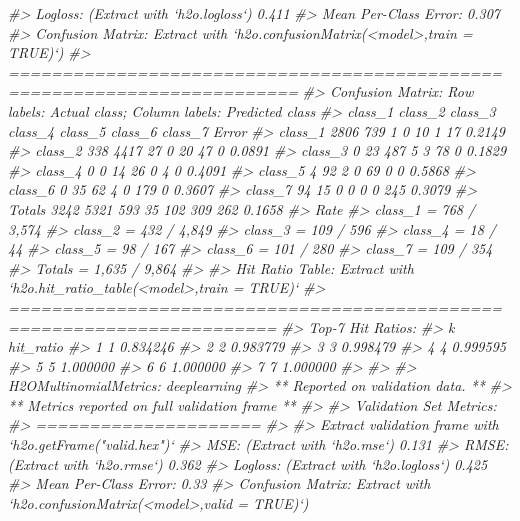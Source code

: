 \documentclass[]{book}
\newenvironment{Shaded}{\begin{snugshade}}{\end{snugshade}}
\newcommand{\CommentTok}[1]{\textcolor[rgb]{0.56,0.35,0.01}{\textit{#1}}}
\begin{document}
\begin{Shaded}
\begin{Highlighting}[]
{{{{{{{{{{{{{{\CommentTok{#> Logloss: (Extract with `h2o.logloss`) 0.411}
\CommentTok{#> Mean Per-Class Error: 0.307}
\CommentTok{#> Confusion Matrix: Extract with `h2o.confusionMatrix(<model>,train = TRUE)`)}
\CommentTok{#> =========================================================================}
\CommentTok{#> Confusion Matrix: Row labels: Actual class; Column labels: Predicted class}
\CommentTok{#>         class_1 class_2 class_3 class_4 class_5 class_6 class_7  Error}
\CommentTok{#> class_1    2806     739       1       0      10       1      17 0.2149}
\CommentTok{#> class_2     338    4417      27       0      20      47       0 0.0891}
\CommentTok{#> class_3       0      23     487       5       3      78       0 0.1829}
\CommentTok{#> class_4       0       0      14      26       0       4       0 0.4091}
\CommentTok{#> class_5       4      92       2       0      69       0       0 0.5868}
\CommentTok{#> class_6       0      35      62       4       0     179       0 0.3607}
\CommentTok{#> class_7      94      15       0       0       0       0     245 0.3079}
\CommentTok{#> Totals     3242    5321     593      35     102     309     262 0.1658}
\CommentTok{#>                    Rate}
\CommentTok{#> class_1 =   768 / 3,574}
\CommentTok{#> class_2 =   432 / 4,849}
\CommentTok{#> class_3 =     109 / 596}
\CommentTok{#> class_4 =       18 / 44}
\CommentTok{#> class_5 =      98 / 167}
\CommentTok{#> class_6 =     101 / 280}
\CommentTok{#> class_7 =     109 / 354}
\CommentTok{#> Totals  = 1,635 / 9,864}
\CommentTok{#> }
\CommentTok{#> Hit Ratio Table: Extract with `h2o.hit_ratio_table(<model>,train = TRUE)`}
\CommentTok{#> =======================================================================}
\CommentTok{#> Top-7 Hit Ratios: }
\CommentTok{#>   k hit_ratio}
\CommentTok{#> 1 1  0.834246}
\CommentTok{#> 2 2  0.983779}
\CommentTok{#> 3 3  0.998479}
\CommentTok{#> 4 4  0.999595}
\CommentTok{#> 5 5  1.000000}
\CommentTok{#> 6 6  1.000000}
\CommentTok{#> 7 7  1.000000}
\CommentTok{#> }
\CommentTok{#> }
\CommentTok{#> H2OMultinomialMetrics: deeplearning}
\CommentTok{#> ** Reported on validation data. **}
\CommentTok{#> ** Metrics reported on full validation frame **}
\CommentTok{#> }
\CommentTok{#> Validation Set Metrics: }
\CommentTok{#> =====================}
\CommentTok{#> }
\CommentTok{#> Extract validation frame with `h2o.getFrame("valid.hex")`}
\CommentTok{#> MSE: (Extract with `h2o.mse`) 0.131}
\CommentTok{#> RMSE: (Extract with `h2o.rmse`) 0.362}
\CommentTok{#> Logloss: (Extract with `h2o.logloss`) 0.425}
\CommentTok{#> Mean Per-Class Error: 0.33}
\CommentTok{#> Confusion Matrix: Extract with `h2o.confusionMatrix(<model>,valid = TRUE)`)}
}}}}}}}}}}}}}}
\end{Highlighting}
\end{Shaded}
\end{document}
